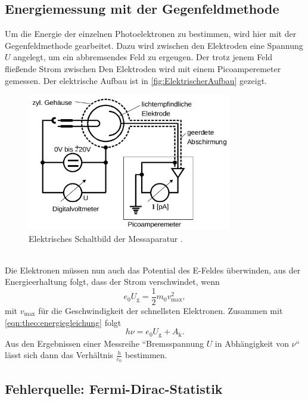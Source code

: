 \subsection{Energiemessung mit der Gegenfeldmethode}
\label{sec:Energiemessung mit der Gegenfeldmethode}

Um die Energie der einzelnen Photoelektronen zu bestimmen, wird hier mit der
Gegenfeldmethode gearbeitet. Dazu wird zwischen den Elektroden eine Spannung $U$ angelegt,
um ein abbremsendes Feld zu ergeugen. Der trotz jenem Feld fließende Strom zwischen Den
Elektroden wird mit einem Picoamperemeter gemessen. Der elektrische Aufbau ist in
\autoref{fig:ElektrischerAufbau} gezeigt.
\begin{figure}
	\centering
	\includegraphics[height=6cm]{pictures/ElektrischerAufbau.png}
	\caption{Elektrisches Schaltbild der Messaparatur \cite{anleitung}.}
	\label{fig:ElektrischerAufbau}
\end{figure}
\\
Die Elektronen müssen nun auch das Potential des E-Feldes überwinden, aus der
Energieerhaltung folgt, dass der Strom verschwindet, wenn
\begin{equation}
	\label{eqn:v_max}
	e_0 U_\text{g} = \frac12 m_0 v_\text{max}^2,
\end{equation}
mit $v_\text{max}$ für die Geschwindigkeit der schnellsten Elektronen. 
Zusammen mit \autoref{eqn:theo:energiegleichung}
folgt 
\begin{equation}
	h\nu = e_0 U_\text{g} + A_\text{k}.
\end{equation}
Aus den Ergebnissen einer Messreihe ``Bremsspannung $U$ in Abhängigkeit von $\nu$`` lässt
sich dann das Verhältnis $\frac{h}{e_0}$ bestimmen.

\subsection{Fehlerquelle: Fermi-Dirac-Statistik}
\label{sec:Fehlerquelle: Fermi-Dirac-Statistik}

